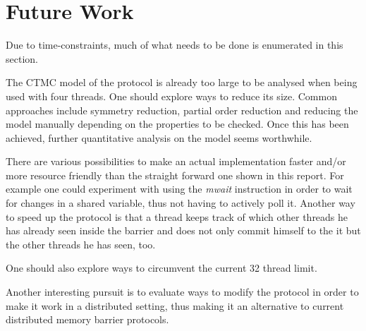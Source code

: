 \documentclass[a4paper, 10pt]{article}
\begin{document}
\section{Future Work}
Due to time-constraints, much of what needs to be done is enumerated in this section.

The CTMC model of the protocol is already too large to be analysed when being used with four threads. One should explore ways to reduce its size. Common approaches include symmetry reduction, partial order reduction and reducing the model manually depending on the properties to be checked. Once this has been achieved, further quantitative analysis on the model seems worthwhile.

There are various possibilities to make an actual implementation faster and/or more resource friendly than the straight forward one shown in this report. For example one could experiment with using the \emph{mwait} instruction in order to wait for changes in a shared variable, thus not having to actively poll it. Another way to speed up the protocol is that a thread keeps track of which other threads he has already seen inside the barrier and does not only commit himself to the it but the other threads he has seen, too.

One should also explore ways to circumvent the current 32 thread limit.

Another interesting pursuit is to evaluate ways to modify the protocol in order to make it work in a distributed setting, thus making it an alternative to current distributed memory barrier protocols.

\nocite{*} %

{}
\end{document}
